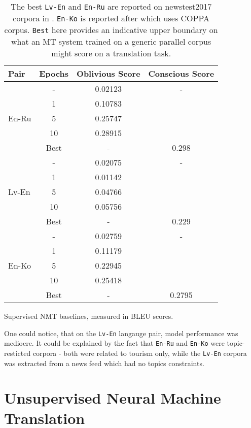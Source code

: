 \documentclass[]{article}
\begin{document}
\begin{table}
\begin{center}
\begin{tabular}{ l c c c }
Pair & Epochs & Oblivious Score & Conscious Score \\
\hline
\multirow{5}{4em}{En-Ru} & - & 0.02123 & - \\
& 1 & 0.10783 & \\
& 5 & 0.25747 & \\
& 10 & 0.28915 & \\
& Best & -  & 0.298 \\
\hline
\multirow{5}{4em}{Lv-En} & - & 0.02075 & - \\
& 1 & 0.01142 & \\
& 5 & 0.04766 & \\
& 10 & 0.05756 & \\
& Best & - & 0.229 \\
\hline
\multirow{5}{4em}{En-Ko} & - & 0.02759 & - \\
& 1 & 0.11179 & \\
& 5 & 0.22945 & \\
& 10 & 0.25418 & \\
& Best & - & 0.2795
\end{tabular}
\end{center}
\caption{Supervised NMT baselines, measured in BLEU scores.}
\caption*{\small
The best {\tt Lv-En} and  {\tt En-Ru} are reported on newstest2017 corpora in \cite{bojar2017findings}.
{\tt En-Ko} is reported after \cite{junczys2016coppa} which uses COPPA corpus.
{\tt Best} here provides an indicative upper boundary on what an MT system trained on a generic parallel corpus might score on a translation task.
}
\label{table:baselines}
\end{table}

One could notice, that on the {\tt Lv-En} langauge pair, model performance was mediocre.
It could be explained by the fact that {\tt En-Ru} and {\tt En-Ko} were topic-resticted corpora - both were related to tourism only, while the {\tt Lv-En} corpora was extracted from a news feed which had no topics constraints.

\section{Unsupervised Neural Machine Translation}
\label{sect:unmt}
\end{document}
